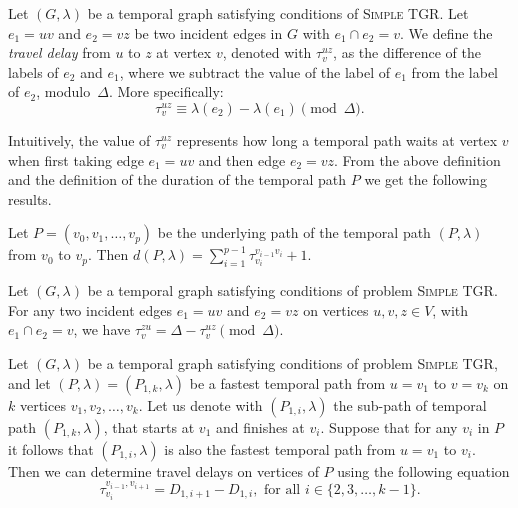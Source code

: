 \documentclass[a4paper,UKenglish,cleveref, autoref, thm-restate,anonymous]{lipics-v2021}
\newcommand{\deltaExact}{\textsc{Simple TGR}}
\begin{document}
    \begin{definition}
    Let $(G, \lambda)$ be a temporal graph satisfying conditions of \deltaExact.
    Let $e_1=uv$ and $e_2=vz$ be two incident edges in $G$ with $e_1 \cap e_2 = v$.
    We define the \emph{travel delay} from $u$ to $z$ at vertex $v$, denoted with $\tau_v^{uz}$,
    as the difference of the labels of $e_2$ and $e_1$, where we subtract the value of the label of $e_1$ from the label of $e_2$,  modulo~$\Delta$.
    More specifically:
    \begin{equation}\label{eq:def-VertexWaitingTime}
       \tau_v^{uz} \equiv \lambda (e_2) - \lambda(e_1) \pmod \Delta.
    \end{equation}
    \end{definition}
    Intuitively, the value of $\tau_v^{uz}$ represents how long a temporal path waits at vertex $v$ when first taking edge $e_1=uv$ and then edge $e_2 = vz$.
    From the above definition and the definition of the duration of the temporal path $P$ we get the following results.
    \begin{observation}[$\star$]\label{obs:durationPwithWaitingTimes}
        Let $P = (v_0, v_1, \dots, v_p)$ be the underlying path of the temporal path
        $(P, \lambda)$ from $v_0$ to $v_p$.
        Then $d(P,\lambda) = \sum_{i = 1}^{p-1} \tau_{v_i}^{v_{i-1}v_i} + 1 $.
    \end{observation}
    \begin{observation}[$\star$]\label{obs:travel-delays-both-directions}
    Let $(G, \lambda)$ be a temporal graph satisfying conditions of problem \deltaExact.
    For any two incident edges $e_1 = uv$ and $e_2 = vz$ on vertices $u,v,z \in V$, with $e_1 \cap e_2 = v$, we have $\tau_v^{zu} = \Delta - \tau_v^{uz} \pmod \Delta$.
    \end{observation}
\begin{lemma} [$\star$]\label{lemma:unique-fastest-path-allDelays}
    Let $(G, \lambda)$ be a temporal graph satisfying conditions of problem \deltaExact,
    and let $(P,\lambda)=(P_{1,k},\lambda)$ be a fastest temporal path from $u=v_1$ to $v=v_k$ on $k$ vertices $v_1,v_2,\dots,v_k$.
    Let us denote with $(P_{1,i}, \lambda)$ the sub-path of temporal path $(P_{1,k},\lambda)$, that starts at $v_1$ and finishes at $v_i$.
    Suppose that for any $v_i$ in $P$ it follows that $(P_{1,i}, \lambda)$ is also the fastest temporal path from $u=v_1$ to $v_i$.
    Then we can determine travel delays on vertices of $P$ using the following equation
    \begin{equation}\label{eq:trav-delays-paths}
        \tau_{v_i}^{v_{i-1},v_{i+1}} = D_{1,i+1} - D_{1,i}, \text{ for all $i \in \{2,3, \dots, k-1\}$.}
    \end{equation}
\end{lemma}
\end{document}
